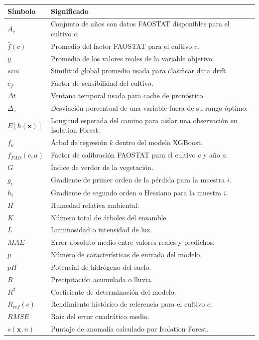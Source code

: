 \documentclass[12pt,letterpaper,oneside]{report}
\begin{document}
\begin{longtable}{p{3cm}p{9.5cm}}
\toprule
\textbf{Símbolo} & \textbf{Significado} \\
\midrule
$A_c$ & Conjunto de años con datos FAOSTAT disponibles para el cultivo $c$. \\
$\bar{f}(c)$ & Promedio del factor FAOSTAT para el cultivo $c$. \\
$\bar{y}$ & Promedio de los valores reales de la variable objetivo. \\
$\bar{sim}$ & Similitud global promedio usada para clasificar data drift. \\
$c_f$ & Factor de sensibilidad del cultivo. \\
$\Delta t$ & Ventana temporal usada para cache de pronóstico. \\
$\Delta_v$ & Desviación porcentual de una variable fuera de su rango óptimo. \\
$E[h(\mathbf{x})]$ & Longitud esperada del camino para aislar una observación en Isolation Forest. \\
$f_k$ & Árbol de regresión $k$ dentro del modelo XGBoost. \\
$f_{FAO}(c,a)$ & Factor de calibración FAOSTAT para el cultivo $c$ y año $a$. \\
$G$ & Índice de verdor de la vegetación. \\
$g_i$ & Gradiente de primer orden de la pérdida para la muestra $i$. \\
$h_i$ & Gradiente de segundo orden o Hessiano para la muestra $i$. \\
$H$ & Humedad relativa ambiental. \\
$K$ & Número total de árboles del ensamble. \\
$L$ & Luminosidad o intensidad de luz. \\
$MAE$ & Error absoluto medio entre valores reales y predichos. \\
$p$ & Número de características de entrada del modelo. \\
$pH$ & Potencial de hidrógeno del suelo. \\
$R$ & Precipitación acumulada o lluvia. \\
$R^2$ & Coeficiente de determinación del modelo. \\
$R_{ref}(c)$ & Rendimiento histórico de referencia para el cultivo $c$. \\
$RMSE$ & Raíz del error cuadrático medio. \\
$s(\mathbf{x},n)$ & Puntaje de anomalía calculado por Isolation Forest. \\

\end{longtable}
\end{document}
